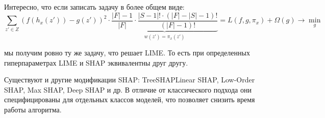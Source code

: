 Интересно, что если записать задачу в более общем виде:
\[
\sum\limits_{z' \in Z} (f(h_x(z')) - g(z'))^2 \cdot \underbrace{\frac{|F|-1}{|F|} \cdot \frac{|S - 1|! \cdot (|F|-|S|-1)!}{(|F|-1)!}}_{w(z') = \pi_x(z')} = L(f, g, \pi_x) + \Omega(g) \rightarrow \min_g
\]

мы получим ровно ту же задачу, что решает LIME. То есть при определенных гиперпараметрах LIME и SHAP эквивалентны друг другу.

Существуют и другие модификации SHAP: TreeSHAPLinear SHAP, Low-Order SHAP, Max SHAP, Deep SHAP и др. В отличие от классического подхода они специфицированы для отдельных классов моделей, что позволяет снизить время работы алгоритма.

